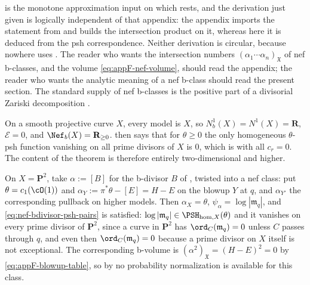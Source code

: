 \begin{remark}
\label{rem:ch35-df-relation}
 is the monotone approximation input
\cite[Theorem~2.1]{DF20} on which
 rests, and the derivation just given is
logically independent of that appendix: the appendix imports the statement
from \cite{DF20} and builds the intersection product on it, whereas here it
is deduced from the psh correspondence.  Neither derivation is circular,
because  nowhere uses
.  The reader who wants the
intersection numbers $(\alpha_1\cdots\alpha_n)_{\mathfrak X}$ of nef
b-classes, and the volume \eqref{eq:appF-nef-volume}, should read the
appendix; the reader who wants the analytic meaning of a nef b-class should
read the present section.  The standard supply of nef b-classes is the
positive part of a divisorial Zariski decomposition
\cite{Bou04,Nak04,BFJ09}.
\end{remark}

\begin{example}
\label{ex:ch35-nef-bclass-examples}
On a smooth projective curve $X$, every model is $X$, so
$N^1_b(X)=N^1(X)=\mathbf R$, $\mathcal E=0$, and
$\Nef_b(X)=\mathbf R_{\geq0}$.  
then says that for $\theta\geq0$ the only homogeneous $\theta$-psh
function vanishing on all prime divisors of $X$ is $0$, which is
 with all $c_r=0$.  The content of the
theorem is therefore entirely two-dimensional and higher.

On $X=\mathbf P^2$, take $\alpha:=[B]$ for the b-divisor $B$ of
, twisted into a nef class: put
$\theta=c_1(\cO(1))$ and $\alpha_Y:=\pi^*\theta-[E]=H-E$ on the blowup
$Y$ at $q$, and $\alpha_{Y'}$ the corresponding pullback on higher
models.  Then $\alpha_X=\theta$, $\psi_\alpha=\log|\mathfrak m_q|$, and
\eqref{eq:nef-bdivisor-psh-pairs} is satisfied:
$\log|\mathfrak m_q|\in\PSH_{\mathrm{hom},X}(\theta)$ and it vanishes on
every prime divisor of $\mathbf P^2$, since a curve in $\mathbf P^2$ has
$\ord_C(\mathfrak m_q)=0$ unless $C$ passes through $q$, and even then
$\ord_C(\mathfrak m_q)=0$ because a prime divisor on $X$ itself is not
exceptional.  The corresponding b-volume is
$(\alpha^2)_{\mathfrak X}=(H-E)^2=0$ by
\eqref{eq:appF-blowup-table}, so by
 no probability normalization is available for
this class.
\end{example}

